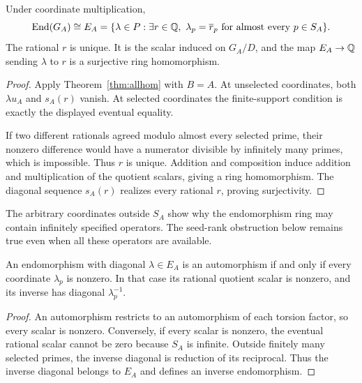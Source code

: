 \begin{corollary}
\label{thm:endGA}
Under coordinate multiplication,
\[
\End(G_A)\cong
E_A=\{\lambda\in P:\exists r\in\Q,\ 
\lambda_p=\overline r_p\text{ for almost every }p\in S_A\}.
\]
The rational $r$ is unique. It is the scalar induced on $G_A/D$, and the map $E_A\to\mathbb Q$ sending $\lambda$ to $r$ is a surjective ring homomorphism.
\end{corollary}
\begin{proof}
Apply Theorem~\ref{thm:allhom} with $B=A$. At unselected coordinates, both $\lambda u_A$ and $s_A(r)$ vanish. At selected coordinates the finite-support condition is exactly the displayed eventual equality.

If two different rationals agreed modulo almost every selected prime, their nonzero difference would have a numerator divisible by infinitely many primes, which is impossible. Thus $r$ is unique. Addition and composition induce addition and multiplication of the quotient scalars, giving a ring homomorphism. The diagonal sequence $s_A(r)$ realizes every rational $r$, proving surjectivity.
\end{proof}
The arbitrary coordinates outside $S_A$ show why the endomorphism ring may contain infinitely specified operators. The seed-rank obstruction below remains true even when all these operators are available.

\begin{corollary}[Automorphisms]
\label{thm:autGA}
An endomorphism with diagonal $\lambda\in E_A$ is an automorphism if and only if every coordinate $\lambda_p$ is nonzero. In that case its rational quotient scalar is nonzero, and its inverse has diagonal $\lambda_p^{-1}$.
\end{corollary}
\begin{proof}
An automorphism restricts to an automorphism of each torsion factor, so every scalar is nonzero. Conversely, if every scalar is nonzero, the eventual rational scalar cannot be zero because $S_A$ is infinite. Outside finitely many selected primes, the inverse diagonal is reduction of its reciprocal. Thus the inverse diagonal belongs to $E_A$ and defines an inverse endomorphism.
\end{proof}

